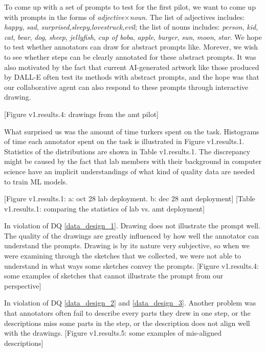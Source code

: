 
To come up with a set of prompts to test for the first pilot, we want to come up with prompts in the forms of \textit{adjective}$\times$\textit{noun}. The list of adjectives includes: \textit{happy}, \textit{sad}, \textit{surprised},\textit{sleepy},\textit{lovestruck},\textit{evil}; the list of nouns includes: \textit{person}, \textit{kid}, \textit{cat}, \textit{bear}, \textit{dog}, \textit{sheep}, \textit{jellyfish}, \textit{cup of boba}, \textit{apple}, \textit{burger}, \textit{sun}, \textit{moon}, \textit{star}. We hope to test whether annotators can draw for abstract prompts like. Morever, we wish to see whether steps can be clearly annotated for these abstract prompts. It was also motivated by the fact that current AI-generated artwork like those produced by DALL-E often test its methods with abstract prompts, and the hope was that our collaborative agent can also respond to these prompts through interactive drawing.   

[Figure v1.results.4: drawings from the amt pilot]

What surprised us was the amount of time turkers spent on the task. Histograms of time each annotator spent on the task is illustrated in Figure v1.results.1. Statistics of the distributions are shown in Table v1.results.1. The discrepancy might be caused by the fact that lab members with their background in computer science have an implicit understandings of what kind of quality data are needed to train ML models.   

[Figure v1.results.1: a: oct 28 lab deployment. b: dec 28 amt deployment]
[Table v1.results.1: comparing the statistics of lab vs. amt deployment]

In violation of DQ \ref{data_design_1}. Drawing does not illustrate the prompt well. The quality of the drawings are greatly influenced by how well the annotator can understand the prompts. Drawing is by its nature very subjective, so when we were examining through the sketches that we collected, we were not able to understand in what ways some sketches convey the prompts. 
[Figure v1.results.4: some examples of sketches that cannot illustrate the prompt from our perspective]

In violation of DQ \ref{data_design_2} and \ref{data_design_3}. Another problem was that annotators often fail to describe every parts they drew in one step, or the descriptions miss some parts in the step, or the description does not align well with the drawings.   
[Figure v1.results.5: some examples of mis-aligned descriptions]